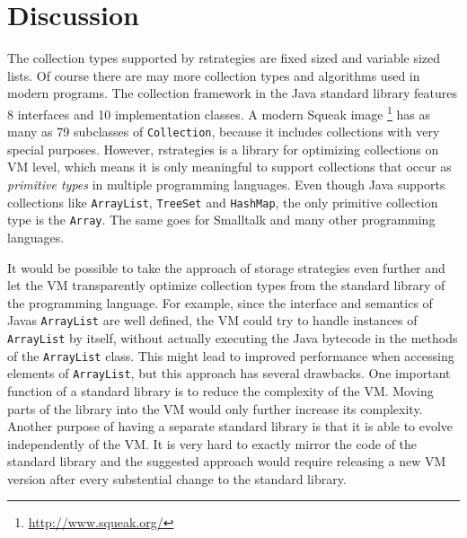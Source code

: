 \section{Discussion}
\label{sec:discussion}


The collection types supported by rstrategies are fixed sized and variable sized lists.
Of course there are may more collection types and algorithms used in modern programs.
The collection framework in the Java standard library features 8 interfaces and 10 implementation classes.
A modern Squeak image \footnote{\url{http://www.squeak.org/}} has as many as 79 subclasses of \lstinline{Collection}, because it includes collections with very special purposes.
However, rstrategies is a library for optimizing collections on VM level, which means it is only meaningful to support collections that occur as \emph{primitive types} in multiple programming languages.
Even though Java supports collections like \lstinline{ArrayList}, \lstinline{TreeSet} and \lstinline{HashMap}, the only primitive collection type is the \lstinline{Array}.
The same goes for Smalltalk and many other programming languages.

It would be possible to take the approach of storage strategies even further and let the VM transparently optimize collection types from the standard library of the programming language.
For example, since the interface and semantics of Javas \lstinline{ArrayList} are well defined, the VM could try to handle instances of \lstinline{ArrayList} by itself, without actually executing the Java bytecode in the methods of the \lstinline{ArrayList} class.
This might lead to improved performance when accessing elements of \lstinline{ArrayList}, but this approach has several drawbacks.
One important function of a standard library is to reduce the complexity of the VM.
Moving parts of the library into the VM would only further increase its complexity.
Another purpose of having a separate standard library is that it is able to evolve independently of the VM.
It is very hard to exactly mirror the code of the standard library and the suggested approach would require releasing a new VM version after every substential change to the standard library.

